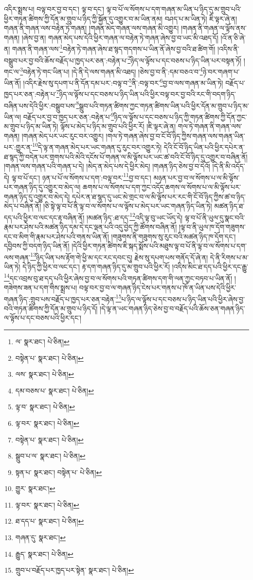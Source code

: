 འདིར་སྨྲས་པ། བལྟ་བར་བྱ་བ་དང་། ལྟ་བ་དང་། ལྟ་བ་པོ་ལ་སོགས་པ་དག་གཞན་མ་ཡིན་པ་ཉིད་དུ་མ་གྲུབ་པའི་ཕྱིར་གཏན་ཚིགས་ཀྱི་དོན་མ་གྲུབ་པ་ཉིད་ཀྱི་སྐྱོན་དུ་འགྱུར་བ་མ་ཡིན་ནམ། བཤད་པ་མ་ཡིན་ཏེ། ཇི་ལྟར་ཞེ་ན། གཞན་ནི་གཞན་ལས་བརྟེན་ཏེ་གཞན། །གཞན་མེད་གཞན་ལས་གཞན་མི་འགྱུར། །གཞན་ནི་གཞན་ལ་ལྟོས་ནས་གཞན། །ཞེས་བྱ་ན། གཞན་མེད་པས་དེའི་ཕྱིར་གཞན་ལ་བརྟེན་ཏེ་གཞན་ཞེས་བྱ་བ་ཡང་མི་འཐད་དོ། །འོ་ན་ཅི་ཞེ་ན། གཞན་ནི་གཞན་ལས་\footnote{ལ་  སྣར་ཐང་།  པེ་ཅིན། }བརྟེན་ཏེ་གཞན་ཞེས་ཐ་སྙད་གདགས་པ་ཡིན་ནོ་ཞེས་བྱ་བའི་ཐ་ཚིག་གོ། །འདིས་ནི་བསྒྲུབ་པར་བྱ་བའི་ཆོས་བརྗོད་པ་ཁྱད་པར་ཅན་:བརྟེན་པ་\footnote{བསྟེན་པ་  སྣར་ཐང་།  པེ་ཅིན། }ཉིད་ལ་ལྟོས་པ་དང་བཅས་པ་ཉིད་ཡིན་པར་བསྟན་ཏོ། །གང་ལ་\footnote{ལས་  སྣར་ཐང་།  པེ་ཅིན། }བརྟེན་ཏེ་གང་ཡིན་པ། །དེ་ནི་དེ་ལས་གཞན་མི་འཐད། །ཅེས་བྱ་བ་ནི་:དམ་བཅའ་བ་\footnote{དམ་བཅས་པ་  སྣར་ཐང་།  པེ་ཅིན། }ཉེ་བར་གཞག་པ་ཡིན་ནོ། །འདིར་རྗེས་སུ་དཔག་པ་ནི་དོན་དམ་པར་:བལྟ་བ་\footnote{ལྟ་བ་  སྣར་ཐང་།  པེ་ཅིན། }ནི་:བལྟ་བར་\footnote{ལྟ་བར་  སྣར་ཐང་།  པེ་ཅིན། }བྱ་བ་ལས་གཞན་མ་ཡིན་ཏེ། བརྗོད་པ་ཁྱད་པར་ཅན་:བརྟེན་པ་\footnote{བསྟེན་པ་  སྣར་ཐང་།  པེ་ཅིན། }ཉིད་ལ་ལྟོས་པ་དང་བཅས་པ་ཉིད་ཡིན་པའི་ཕྱིར་བལྟ་བར་བྱ་བའི་རང་གི་བདག་ཉིད་བཞིན་པས་དེའི་ཕྱིར་:བསྒྲུབ་པས་\footnote{སྒྲུབ་པ་ལ་  སྣར་ཐང་།  པེ་ཅིན། }སྒྲུབ་པའི་གཏན་ཚིགས་ཀྱང་གཏན་ཚིགས་ཡིན་པའི་ཕྱིར་དོན་མ་གྲུབ་པ་ཉིད་མ་ཡིན་ལ། བརྗོད་པར་བྱ་བ་ཁྱད་པར་ཅན་:བརྟེན་པ་\footnote{སྟན་པ་  སྣར་ཐང་། བསྟེན་པ་  པེ་ཅིན། }ཉིད་ལ་ལྟོས་པ་དང་བཅས་པ་ཉིད་ཀྱི་གཏན་ཚིགས་ཀྱི་དོན་ཀྱང་མ་གྲུབ་པ་ཉིད་མ་ཡིན་ཏེ། ལྟོས་པ་མེད་པ་ཉིད་མ་གྲུབ་པའི་ཕྱིར་རོ། །ཇི་ལྟར་ཞེ་ན། གལ་ཏེ་གཞན་ནི་གཞན་ལས་གཞན། །གཞན་མེད་པར་ཡང་རུང་བར་འགྱུར། །གལ་ཏེ་གཞན་ཞེས་བྱ་བ་ངོ་བོ་ཉིད་ཀྱིས་གཞན་ལས་གཞན་ཡིན་པར་:གྱུར་ན་\footnote{གྱུར་  སྣར་ཐང་། }དེ་ལྟ་ན་གཞན་མེད་པར་ཡང་གཞན་དུ་རུང་བར་འགྱུར་ཏེ། དེའི་ངོ་བོ་ཉིད་ཡིན་པའི་ཕྱིར་དཔེར་ན་ཐ་སྙད་ཀྱི་བདེན་པར་གྲགས་པའི་མེའི་དངོས་པོ་གཞན་ལ་མི་ལྟོས་པར་ཡང་ཚ་བའི་ངོ་བོ་ཉིད་དུ་འགྱུར་བ་བཞིན་ནོ། །གཞན་ལས་གཞན་པའི་གཞན་པ་དེ། །མེད་ན་མེད་པས་དེ་ཕྱིར་མེད། །གཞན་ཉིད་ཅེས་བྱ་བ་དེའོ། །དེ་ནི་མི་འདོད་དེ། ལྟ་བ་པོ་དང་། ཉན་པ་པོ་ལ་སོགས་པ་དག་:བལྟ་བར་\footnote{ལྟ་བར་  སྣར་ཐང་།  པེ་ཅིན། }བྱ་བ་དང་། མཉན་པར་བྱ་བ་ལ་སོགས་པ་ལ་མི་ལྟོས་པར་གཞན་ཉིད་དུ་འགྱུར་བ་མེད་ལ། ཆགས་པ་ལ་སོགས་པ་དག་ཀྱང་འདོད་ཆགས་ལ་སོགས་པ་ལ་མི་ལྟོས་པར་གཞན་ཉིད་དུ་འགྱུར་བ་མེད་དེ། དཔེར་ན་ཐ་སྙད་དུ་ཡང་མེ་གྲང་བ་ལ་མི་ལྟོས་པར་རང་གི་ངོ་བོ་ཉིད་ཀྱིས་ཚ་བ་ཉིད་མེད་པ་བཞིན་ནོ། །ཅི་སྟེ་ལྟ་བ་པོ་ནི་ལྟ་བ་ལ་སོགས་པ་ལ་ལྟོས་པ་མེད་པར་ཡང་གཞན་ཉིད་ཡིན་ཏེ། མཚན་ཉིད་ཐ་དད་པའི་ཕྱིར་བ་ལང་དང་རྟ་བཞིན་ནོ། །མཚན་ཉིད་:ཐ་དད་\footnote{ཐ་དད་པ་  སྣར་ཐང་།  པེ་ཅིན། }འདི་ལྟ་བུ་ཡང་ཡོད་དེ། ལྟ་བ་པོ་ནི་ཡུལ་དུ་སྣང་བའི་རྣམ་པར་ཤེས་པའི་མཚན་ཉིད་དམ་དེ་དང་ལྡན་པའི་འདུ་བྱེད་ཀྱི་ཚོགས་བཞིན་ནོ། །ལྟ་བ་ནི་ཡུལ་ཁ་དོག་གཟུགས་དང་བ་མིག་གི་རྣམ་པར་ཤེས་པའི་གནས་ཡིན་ནོ། །གཟུགས་ནི་གཟུགས་སུ་རུང་བའི་མཚན་ཉིད་ཁ་དོག་དང་། དབྱིབས་ཀྱི་བདག་ཉིད་ཡིན་ནོ། །དེའི་ཕྱིར་གཏན་ཚིགས་ཇི་སྐད་སྨོས་པའི་མཐུས་ལྟ་བ་པོ་ནི་ལྟ་བ་ལ་སོགས་པ་དག་ལས་གཞན་\footnote{གཞན་དུ་  སྣར་ཐང་། }ཉིད་ཡིན་པས་རྟོག་གེ་ཕྱི་མ་དང་རང་དབང་དུ། རྗེས་སུ་དཔག་པས་གནོད་དོ་ཞེ་ན། དེ་ནི་རིགས་པ་མ་ཡིན་ཏེ། དེ་ཉིད་ཀྱི་ཕྱིར་བ་ལང་དང་། རྟ་དག་གཞན་ཉིད་དུ་མ་གྲུབ་པའི་ཕྱིར་རོ། །འདིས་མིང་ཐ་དད་པའི་ཕྱིར་དང་རྒྱུ་\footnote{རྒྱུད་  སྣར་ཐང་།  པེ་ཅིན། }དང་འབྲས་བུ་ཐ་དད་པའི་ཕྱིར་ཞེས་བྱ་བ་ལ་སོགས་པའི་གཏན་ཚིགས་དག་གི་ལན་ཀྱང་བཏབ་པ་ཡིན་ནོ། །གཟེགས་ཟན་པ་དག་གིས་སྨྲས་པ། བལྟ་བར་བྱ་བ་ལ་གཞན་ཉིད་ངེས་པར་གནས་པ་ཁོ་ན་ཡིན་པས་དེའི་ཕྱིར་གཞན་ཉིད་:གྲུབ་པས་བརྗོད་པ་ཁྱད་པར་ཅན་བརྟེན་\footnote{གྲུབ་པ་བརྗོད་པར་ཁྱད་པར་སྟེན་  སྣར་ཐང་།  པེ་ཅིན། }པ་ཉིད་ལ་ལྟོས་པ་དང་བཅས་པ་ཉིད་ཡིན་པའི་ཕྱིར་ཞེས་བྱ་བའི་གཏན་ཚིགས་ཀྱི་དོན་མ་གྲུབ་པ་ཉིད་དོ། །དེ་ལྟ་ན་ཡང་གཞན་ཉིད་ཅེས་བྱ་བ་བརྗོད་པའི་ཆོས་ཅན་གཞན་ཉིད་ལ་ལྟོས་པ་དང་བཅས་པའི་ཕྱིར་དང་། 